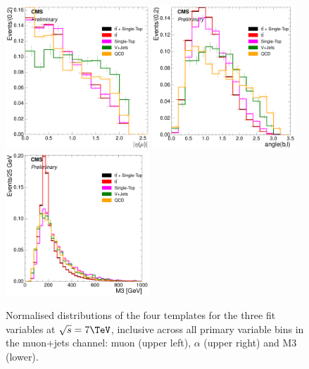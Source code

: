\begin{figure}[hbtp]
    \centering
     \includegraphics[width=0.48\textwidth]{Chapters/04_Analysis/04b_XSections/images/7TeV/fit_variables/muon/MET/muon_absolute_eta/MET_inclusive_muon_absolute_eta_2orMoreBtags_templates.pdf}\hfill
	 \includegraphics[width=0.48\textwidth]{Chapters/04_Analysis/04b_XSections/images/7TeV/fit_variables/muon/MET/angle_bl/MET_inclusive_angle_bl_2orMoreBtags_templates.pdf}\\
	 \includegraphics[width=0.48\textwidth]{Chapters/04_Analysis/04b_XSections/images/7TeV/fit_variables/muon/MET/M3/MET_inclusive_M3_2orMoreBtags_templates.pdf}\\
	 \caption{Normalised distributions of the four templates for the three fit variables at $\sqrt{s}=7\TeV$,
	 inclusive across all primary variable bins in the muon+jets channel: muon \abseta (upper left),
	 $\alpha$ (upper right) and M3 (lower).}
     \label{fig:fit_variable_distributions_muon_7TeV}
\end{figure}

